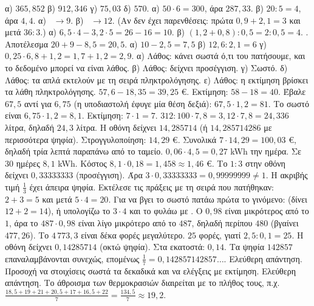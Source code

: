  α) $365{,}852$ \quad β) $912{,}346$ \quad γ) $75{,}03$ \quad δ) $570$.
 α) $50\cdot6=300$, άρα $287{,}33$. β) $20:5=4$, άρα $4{,}4$.
 α) \key{(}\kpl{}\key{)}\kpo{}\kis\ $\to9$. β) \kdi\key{(}\kpl{}\key{)}\kis\ $\to12$. (Αν δεν έχει παρενθέσεις: πρώτα $0{,}9+2{,}1=3$ και μετά $36:3$.)
 α) $6{,}5\cdot4-3{,}2\cdot5=26-16=10$. β) $(1{,}2+0{,}8):0{,}5=2:0{,}5=4$.
  \kpo{}\kis{} \kpo{}\kis{} \kpo{}\kis{} . Αποτέλεσμα $20+9-8{,}5=20{,}5$.
 α) $10-2{,}5=7{,}5$ \quad β) $12{,}6:2{,}1=6$ \quad γ) $0{,}25\cdot6{,}8+1{,}2=1{,}7+1{,}2=2{,}9$.
 α) Λάθος: κάνει σωστά ό,τι του πατήσουμε, και το δεδομένο μπορεί να είναι λάθος. β) Λάθος: δείχνει προσέγγιση. γ) Σωστό. δ) Λάθος: τα απλά εκτελούν με τη σειρά πληκτρολόγησης. ε) Λάθος: η εκτίμηση βρίσκει τα λάθη πληκτρολόγησης.
 $57{,}6-18{,}35=39{,}25$ €. Εκτίμηση: $58-18=40$.
 Έβαλε $67{,}5$ αντί για $6{,}75$ (η υποδιαστολή έφυγε μία θέση δεξιά): $67{,}5\cdot1{,}2=81$. Το σωστό είναι $6{,}75\cdot1{,}2=8{,}1$. Εκτίμηση: $7\cdot1=7$.
 $312:100\cdot7{,}8=3{,}12\cdot7{,}8=24{,}336$ λίτρα, δηλαδή $24{,}3$ λίτρα.
 Η οθόνη δείχνει $14{,}285714$ (ή $14{,}285714286$ με περισσότερα ψηφία). Στρογγυλοποίηση: $14{,}29$ €. Συνολικά $7\cdot14{,}29=100{,}03$ €, δηλαδή τρία λεπτά παραπάνω από το ταμείο.
 $0{,}06\cdot4{,}5=0{,}27$ kWh την ημέρα. Σε $30$ ημέρες $8{,}1$ kWh. Κόστος $8{,}1\cdot0{,}18=1{,}458\approx1{,}46$ €.
 Το $1:3$ στην οθόνη δείχνει $0{,}33333333$ (προσέγγιση). Άρα $3\cdot0{,}33333333=0{,}99999999\neq1$. Η ακριβής τιμή $\frac{1}{3}$ έχει άπειρα ψηφία.
 Εκτέλεσε τις πράξεις με τη σειρά που πατήθηκαν: $2+3=5$ και μετά $5\cdot4=20$. Για να βγει το σωστό πατάω πρώτα το γινόμενο: \kpo{}\kpl{}\kis{} (δίνει $12+2=14$), ή υπολογίζω το $3\cdot4$ και το φυλάω με .
 Ο $0{,}98$ είναι μικρότερος από το $1$, άρα το $487\cdot0{,}98$ είναι λίγο μικρότερο από το $487$, δηλαδή περίπου $480$ (βγαίνει $477{,}26$). Το $4\,773{,}3$ είναι δέκα φορές μεγαλύτερο.
 $25$ φορές, γιατί $2{,}5:0{,}1=25$.
 Η οθόνη δείχνει $0{,}14285714$ (οκτώ ψηφία). Στα εκατοστά: $0{,}14$. Τα ψηφία $142857$ επαναλαμβάνονται συνεχώς, επομένως $\frac{1}{7}=0{,}142857142857\ldots$.
 Ελεύθερη απάντηση. Προσοχή να στοιχίσεις σωστά τα δεκαδικά και να ελέγξεις με εκτίμηση.
 Ελεύθερη απάντηση. Το άθροισμα των θερμοκρασιών διαιρείται με το πλήθος τους, π.χ. $\frac{18{,}5+19+21+20{,}5+17+16{,}5+22}{7}=\frac{134{,}5}{7}\approx19{,}2$.

